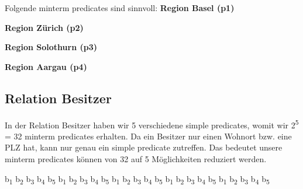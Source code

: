\documentclass[11pt,a4paper,parskip=half]{scrartcl}
\begin{document}
Folgende minterm predicates sind sinnvoll:\newline
\textbf{Region Basel (p1)}\newline

\textbf{Region Zürich (p2)}\newline

\textbf{Region Solothurn (p3)}\newline

\textbf{Region Aargau (p4)}\newline

\subsection{Relation Besitzer}
In der Relation Besitzer haben wir 5 verschiedene simple predicates, womit wir 2\textsuperscript{5} = 32 minterm predicates erhalten. Da ein Besitzer nur einen Wohnort bzw. eine PLZ hat, kann nur genau ein simple predicate zutreffen. Das bedeutet unsere minterm predicates können von 32 auf 5 Möglichkeiten reduziert werden.\newline

b\textsubscript{1} b\textsubscript{2} b\textsubscript{3} b\textsubscript{4} b\textsubscript{5}\newline
b\textsubscript{1} b\textsubscript{2} b\textsubscript{3} b\textsubscript{4} b\textsubscript{5}\newline
b\textsubscript{1} b\textsubscript{2} b\textsubscript{3} b\textsubscript{4} b\textsubscript{5}\newline
b\textsubscript{1} b\textsubscript{2} b\textsubscript{3} b\textsubscript{4} b\textsubscript{5}\newline
b\textsubscript{1} b\textsubscript{2} b\textsubscript{3} b\textsubscript{4} b\textsubscript{5}\newline
\end{document}
